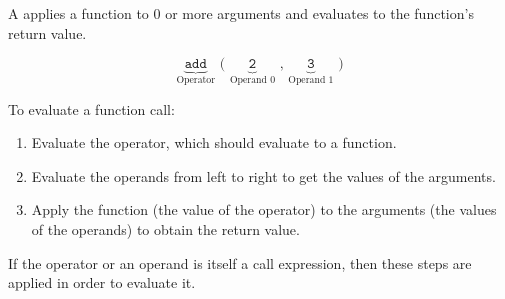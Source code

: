 A  applies a function to 0 or more arguments and
evaluates to the function's return value.

\begin{blocksection}
\begin{equation*}
    \underbrace{\texttt{add}}_\text{Operator}
    \texttt{ ( }
    \underbrace{\texttt{2}}_\text{Operand 0}
    \texttt{ , }
    \underbrace{\texttt{3}}_\text{Operand 1}
    \texttt{ )}
\end{equation*}
\end{blocksection}

\begin{blocksection}
To evaluate a function call:
\begin{enumerate}
\item Evaluate the operator, which should evaluate to a function.
\item Evaluate the operands from left to right to get the values of the
arguments.
\item Apply the function (the value of the operator) to the arguments (the
values of the operands) to obtain the return value.
\end{enumerate}
\end{blocksection}

If the operator or an operand is itself a call expression, then these steps are
applied in order to evaluate it.
